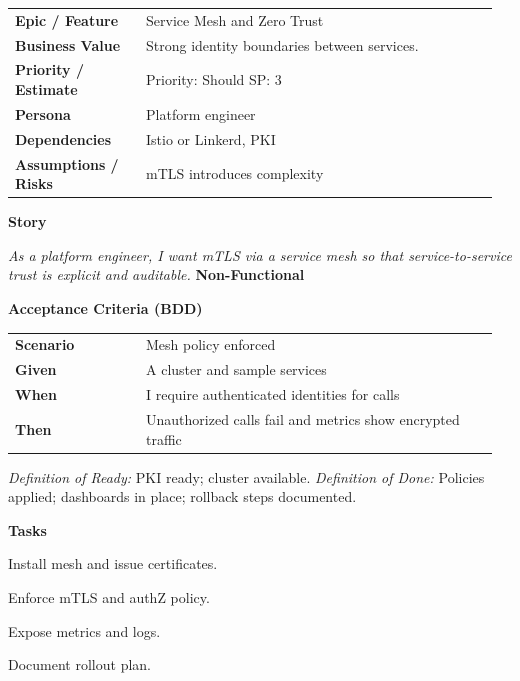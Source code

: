 \documentclass[11pt,letterpaper]{article}
\makeatletter
\newenvironment{kvtable}{%
  \begin{tabular}{@{}>{\bfseries\arraybackslash}p{0.26\linewidth} p{0.70\linewidth}@{}}
}{\end{tabular}}
\newenvironment{bdd}{%
  \begin{tabular}{@{}>{\bfseries\arraybackslash}p{0.26\linewidth} p{0.70\linewidth}@{}}
}{\end{tabular}}
\newcommand{\DoRDoD}[2]{%
  \vspace{0.35em}
  {\footnotesize\color{Muted}%
    \textit{Definition of Ready:} #1 \; \textbullet\;
    \textit{Definition of Done:} #2%
  }%
}
\newenvironment{storycard}[2]{%
  \begin{tcolorbox}[cloudcard, title={#1 --- #2}]%
}{\end{tcolorbox}}
\newcommand{\sectionlabel}[1]{\vspace{0.35em}\textbf{#1}\par}
\makeatother
\begin{document}
\begin{storycard}{CCS-31}{Ch. 31 — Advanced Security Architecture}
\begin{kvtable}
Epic / Feature & Service Mesh and Zero Trust\\
Business Value & Strong identity boundaries between services.\\
Priority / Estimate & Priority: Should \quad SP: 3\\
Persona & Platform engineer\\
Dependencies & Istio or Linkerd, PKI\\
Assumptions / Risks & mTLS introduces complexity\\
\end{kvtable}
\sectionlabel{Story}
\textit{As a platform engineer, I want mTLS via a service mesh so that service-to-service trust is explicit and auditable.}
\sectionlabel{Non-Functional}\;\;
\sectionlabel{Acceptance Criteria (BDD)}
\begin{bdd}
Scenario & Mesh policy enforced\\
Given & A cluster and sample services\\
When & I require authenticated identities for calls\\
Then & Unauthorized calls fail and metrics show encrypted traffic\\
\end{bdd}
\DoRDoD{PKI ready; cluster available.}{Policies applied; dashboards in place; rollback steps documented.}
\sectionlabel{Tasks}
\begin{checklist}
\item Install mesh and issue certificates.
\item Enforce mTLS and authZ policy.
\item Expose metrics and logs.
\item Document rollout plan.
\end{checklist}
\end{storycard}
\end{document}
